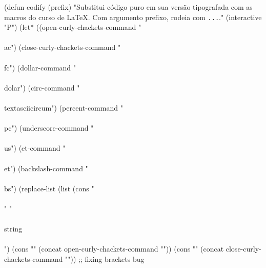 (defun codify (prefix)
  "Substitui código puro em sua versão tipografada com as macros do
  curso de LaTeX. Com argumento prefixo, rodeia com \texttt{...}."
  (interactive "P")
  (let* ((open-curly-chackets-command "\\\\ac")
	 (close-curly-chackets-command "\\\\fc")
	 (dollar-command "\\\\dolar")
         (circ-command "\\\\textasciicircum")
	 (percent-command "\\\\pc")
         (underscore-command "\\\\us")
         (et-command "\\\\et")
         (backslash-command "\\\\bs")
	 (replace-list (list
			 (cons "\\\\" "\\\\string\\\\")
			 (cons "{" (concat open-curly-chackets-command "{}"))
			 (cons "}" (concat close-curly-chackets-command "{}"))
			 ;; fixing brackets bug
